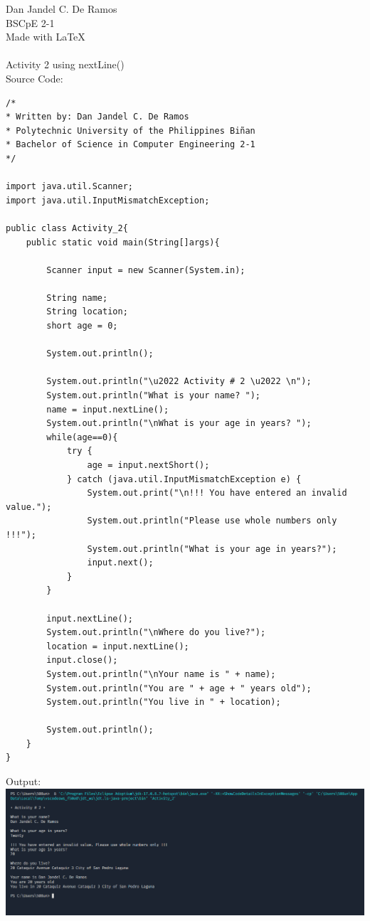 \documentclass[12pt]{article}
\begin{document}
 
	\noindent
	Dan Jandel C. De Ramos\\
	BSCpE 2-1\\
	Made with \LaTeX \\
	\\
	Activity 2 using nextLine()\\
	Source Code:
		
	\begin{verbatim}         
/*
* Written by: Dan Jandel C. De Ramos
* Polytechnic University of the Philippines Biñan
* Bachelor of Science in Computer Engineering 2-1
*/

import java.util.Scanner;
import java.util.InputMismatchException;

public class Activity_2{
	public static void main(String[]args){
		
		Scanner input = new Scanner(System.in);
		
		String name;
		String location;
		short age = 0;
		
		System.out.println();
		
		System.out.println("\u2022 Activity # 2 \u2022 \n");
		System.out.println("What is your name? ");
		name = input.nextLine();
		System.out.println("\nWhat is your age in years? ");        
		while(age==0){            
			try {
				age = input.nextShort();
			} catch (java.util.InputMismatchException e) {            
				System.out.print("\n!!! You have entered an invalid value.");
				System.out.println("Please use whole numbers only !!!");  
				System.out.println("What is your age in years?");
				input.next();          
			}
		}
				
		input.nextLine();
		System.out.println("\nWhere do you live?");
		location = input.nextLine();
		input.close();
		System.out.println("\nYour name is " + name);
		System.out.println("You are " + age + " years old");
		System.out.println("You live in " + location);
		
		System.out.println();
	}
}
	\end{verbatim}
	\clearpage
	\noindent
	Output:\\
	\includegraphics[width=\textwidth]{output}
\end{document}
